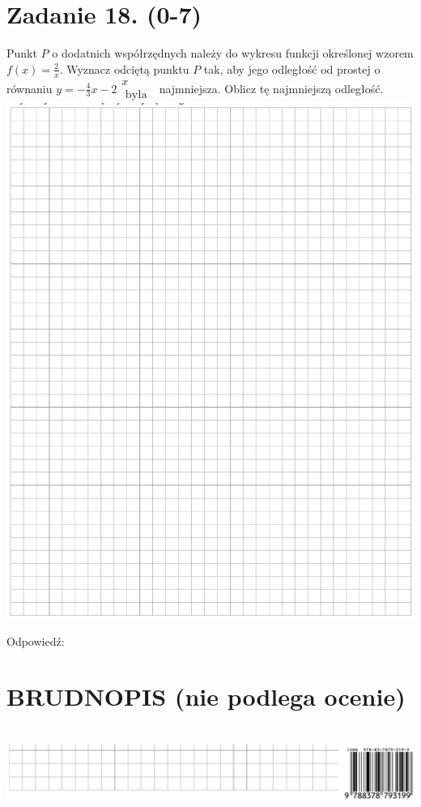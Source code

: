 \documentclass[10pt]{article}
\begin{document}
\section*{Zadanie 18. (0-7)}
Punkt \(P\) o dodatnich współrzędnych należy do wykresu funkcji określonej wzorem \(f(x)=\frac{2}{x}\). Wyznacz odciętą punktu \(P\) tak, aby jego odległość od prostej o równaniu \(y=-\frac{4}{3} x-2 \begin{gathered}x \\ \text { była }\end{gathered}\) najmniejsza. Oblicz tę najmniejszą odległość.\\
\includegraphics[max width=\textwidth, center]{2024_11_21_c0ca116654784d42326bg-15}

Odpowiedź:

\section*{BRUDNOPIS (nie podlega ocenie)}
\(\qquad\)\\
\includegraphics[max width=\textwidth, center]{2024_11_21_c0ca116654784d42326bg-16}
\end{document}
